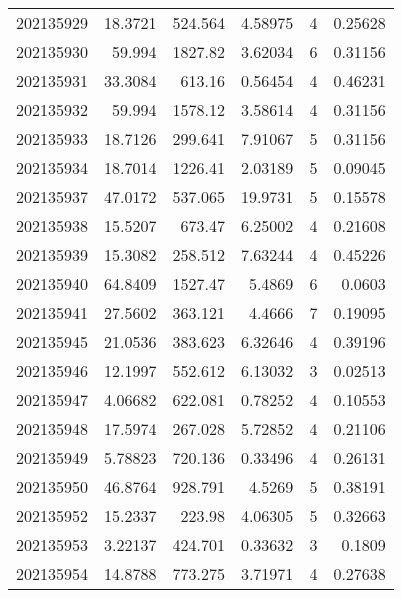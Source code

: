 \begin{tabular}{rrrrrr}
 202135929 &         18.3721  &      524.564  &            4.58975 &           4 & 0.25628 \\
 202135930 &         59.994   &     1827.82   &            3.62034 &           6 & 0.31156 \\
 202135931 &         33.3084  &      613.16   &            0.56454 &           4 & 0.46231 \\
 202135932 &         59.994   &     1578.12   &            3.58614 &           4 & 0.31156 \\
 202135933 &         18.7126  &      299.641  &            7.91067 &           5 & 0.31156 \\
 202135934 &         18.7014  &     1226.41   &            2.03189 &           5 & 0.09045 \\
 202135937 &         47.0172  &      537.065  &           19.9731  &           5 & 0.15578 \\
 202135938 &         15.5207  &      673.47   &            6.25002 &           4 & 0.21608 \\
 202135939 &         15.3082  &      258.512  &            7.63244 &           4 & 0.45226 \\
 202135940 &         64.8409  &     1527.47   &            5.4869  &           6 & 0.0603  \\
 202135941 &         27.5602  &      363.121  &            4.4666  &           7 & 0.19095 \\
 202135945 &         21.0536  &      383.623  &            6.32646 &           4 & 0.39196 \\
 202135946 &         12.1997  &      552.612  &            6.13032 &           3 & 0.02513 \\
 202135947 &          4.06682 &      622.081  &            0.78252 &           4 & 0.10553 \\
 202135948 &         17.5974  &      267.028  &            5.72852 &           4 & 0.21106 \\
 202135949 &          5.78823 &      720.136  &            0.33496 &           4 & 0.26131 \\
 202135950 &         46.8764  &      928.791  &            4.5269  &           5 & 0.38191 \\
 202135952 &         15.2337  &      223.98   &            4.06305 &           5 & 0.32663 \\
 202135953 &          3.22137 &      424.701  &            0.33632 &           3 & 0.1809  \\
 202135954 &         14.8788  &      773.275  &            3.71971 &           4 & 0.27638 \\

\end{tabular}
